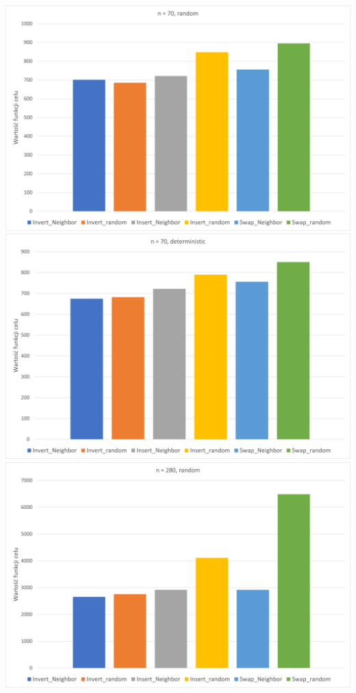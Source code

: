 \documentclass{article}
\begin{document}
\includegraphics[scale=0.36]{70_rand}
\includegraphics[scale=0.36]{70_deter}
\includegraphics[scale=0.36]{280_rand}
\end{document}
